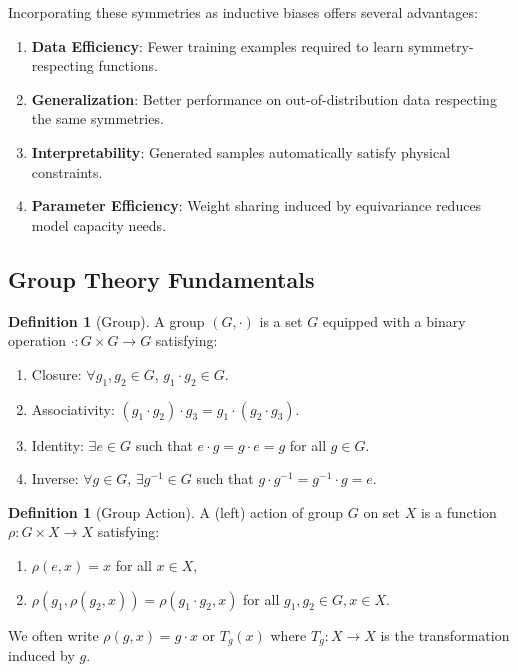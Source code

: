 \documentclass[12pt]{report}
\theoremstyle{definition}
\newtheorem{definition}[theorem]{Definition}
\begin{document}
Incorporating these symmetries as inductive biases offers several advantages:

\begin{enumerate}
\item \textbf{Data Efficiency}: Fewer training examples required to learn symmetry-respecting functions.
\item \textbf{Generalization}: Better performance on out-of-distribution data respecting the same symmetries.
\item \textbf{Interpretability}: Generated samples automatically satisfy physical constraints.
\item \textbf{Parameter Efficiency}: Weight sharing induced by equivariance reduces model capacity needs.
\end{enumerate}

\subsection{Group Theory Fundamentals}

\begin{definition}[Group]
A group $(G, \cdot)$ is a set $G$ equipped with a binary operation $\cdot: G \times G \to G$ satisfying:
\begin{enumerate}
\item Closure: $\forall g_1, g_2 \in G$, $g_1 \cdot g_2 \in G$.
\item Associativity: $(g_1 \cdot g_2) \cdot g_3 = g_1 \cdot (g_2 \cdot g_3)$.
\item Identity: $\exists e \in G$ such that $e \cdot g = g \cdot e = g$ for all $g \in G$.
\item Inverse: $\forall g \in G$, $\exists g^{-1} \in G$ such that $g \cdot g^{-1} = g^{-1} \cdot g = e$.
\end{enumerate}
\end{definition}

\begin{definition}[Group Action]
A (left) action of group $G$ on set $X$ is a function $\rho: G \times X \to X$ satisfying:
\begin{enumerate}
\item $\rho(e, x) = x$ for all $x \in X$,
\item $\rho(g_1, \rho(g_2, x)) = \rho(g_1 \cdot g_2, x)$ for all $g_1, g_2 \in G, x \in X$.
\end{enumerate}
We often write $\rho(g, x) = g \cdot x$ or $T_g(x)$ where $T_g: X \to X$ is the transformation induced by $g$.
\end{definition}
\end{document}
